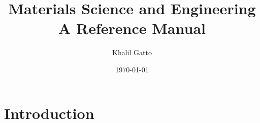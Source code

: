 \documentclass{article}
\title{Materials Science and Engineering\\A Reference Manual}
\author{Khalil Gatto}
\date{\today}
\begin{document}
\maketitle

\section{Introduction}
\end{document}
